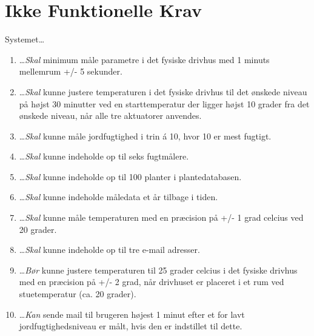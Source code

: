 \section{Ikke Funktionelle Krav}
Systemet\ldots
\begin{enumerate}\itemsep1pt \parskip0pt 
	\item \ldots \emph{Skal} minimum måle parametre i det fysiske drivhus med 1 minuts mellemrum +/- 5 sekunder.
	\item \ldots \emph{Skal} kunne justere temperaturen i det fysiske drivhus til det ønskede niveau på højst 30 minutter ved en starttemperatur der ligger højst 10 grader fra det ønskede niveau, når alle tre aktuatorer anvendes.
	\item \ldots \emph{Skal} kunne måle jordfugtighed i trin á 10, hvor 10 er mest fugtigt. 
	\item \ldots \emph{Skal} kunne indeholde op til seks fugtmålere.
	\item \ldots \emph{Skal} kunne indeholde op til 100 planter i plantedatabasen.
	\item \ldots \emph{Skal} kunne indeholde måledata et år tilbage i tiden.
	\item \ldots \emph{Skal} kunne måle temperaturen med en præcision på +/- 1 grad celcius ved 20 grader.
	\item \ldots \emph{Skal} kunne indeholde op til tre e-mail adresser.
	\item \ldots \emph{Bør} kunne justere temperaturen til 25 grader celcius i det fysiske drivhus med en præcision på +/- 2 grad, når drivhuset er placeret i et rum ved stuetemperatur (ca. 20 grader).
	\item \ldots \emph{Kan} sende mail til brugeren højest 1 minut efter et for lavt jordfugtighedsniveau er målt, hvis den er indstillet til dette.
\end{enumerate}


